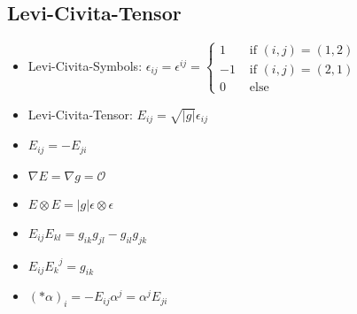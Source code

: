 \documentclass{scrartcl}
\newlength{\wlen}
\newcommand{\upperleft}[2]{\,\settowidth{\wlen}{$#2$}\hspace{-\wlen}\mbox{$\phantom{#2}$}^{#1}{#2}}
\newcommand{\lflat}[1]{\upperleft{\flat}{#1}}
\newcommand{\fstensor}[3]{{{#1}_{#2}}^{#3}}
\newcommand{\ffbasis}[2]{dx^{#1} \otimes dx^{#2}}
\begin{document}
    \subsection{Levi-Civita-Tensor}
      \begin{itemize}
        \item Levi-Civita-Symbols: 
             \( \epsilon_{ij} = \epsilon^{ij} =  
                  \begin{cases}
                    1 & \text{ if } (i,j)=(1,2) \\
                    -1 & \text{ if } (i,j)=(2,1) \\
                    0 & \text{ else}
                  \end{cases}\) 
        \item Levi-Civita-Tensor:
              \( E_{ij} = \sqrt{|g|}\epsilon_{ij} \)
        \item \( E_{ij} = -E_{ji} \)
        \item \( \nabla E = \nabla g = \mathcal{O} \)
        \item \( E\otimes E = |g| \epsilon \otimes \epsilon\)
        \item \( E_{ij}E_{kl} = g_{ik}g_{jl} - g_{il}g_{jk} \)
        \item \( E_{ij}\fstensor{E}{k}{j} = g_{ik} \)
        \item \( (*\alpha)_{i} = -E_{ij}\alpha^{j} = \alpha^{j}E_{ji}  \)
      \end{itemize}

    
\end{document}
